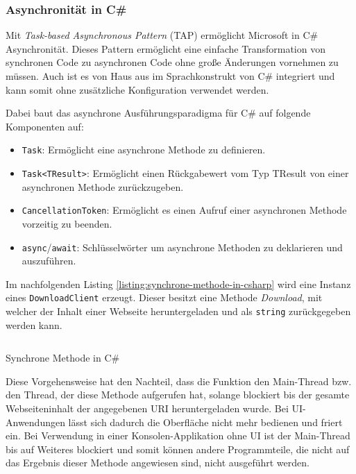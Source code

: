 \subsubsection{Asynchronität in C\#}
\label{subsubsec:ansynchronitaet-in-csharp}

Mit \textit{Task-based Asynchronous Pattern} (TAP) ermöglicht Microsoft in C\# Asynchronität. Dieses Pattern ermöglicht eine einfache Transformation von synchronen Code zu asynchronen Code ohne große Änderungen vornehmen zu müssen. Auch ist es von Haus aus im Sprachkonstrukt von C\# integriert und kann somit ohne zusätzliche Konfiguration verwendet werden.

Dabei baut das asynchrone Ausführungsparadigma für C\# auf folgende Komponenten auf:
\begin{itemize}
    \item \texttt{Task}: Ermöglicht eine asynchrone Methode zu definieren.
    \item \texttt{Task<TResult>}: Ermöglicht einen Rückgabewert vom Typ TResult von einer asynchronen Methode zurückzugeben.
    \item \texttt{CancellationToken}: Ermöglicht es einen Aufruf einer asynchronen Methode vorzeitig zu beenden.
    \item \texttt{async}/\texttt{await}: Schlüsselwörter um asynchrone Methoden zu deklarieren und auszuführen.
\end{itemize}

Im nachfolgenden Listing \ref{listing:synchrone-methode-in-csharp} wird eine Instanz eines \texttt{DownloadClient} erzeugt. Dieser besitzt eine Methode \textit{Download}, mit welcher der Inhalt einer Webseite heruntergeladen und als \texttt{string} zurückgegeben werden kann.

\begin{listing}[H]
    \inputminted[framesep=2mm, baselinestretch=1.2, fontsize=\normalsize, linenos]{csharp}{codes/example_synchronous.cs}
    \caption{Synchrone Methode in C\#}
    \label{listing:synchrone-methode-in-csharp}
\end{listing}

Diese Vorgehensweise hat den Nachteil, dass die Funktion den Main-Thread bzw. den Thread, der diese Methode aufgerufen hat, solange blockiert bis der gesamte Webseiteninhalt der angegebenen URI heruntergeladen wurde. Bei UI-Anwendungen lässt sich dadurch die Oberfläche nicht mehr bedienen und friert ein. Bei Verwendung in einer Konsolen-Applikation ohne UI ist der Main-Thread bis auf Weiteres blockiert und somit können andere Programmteile, die nicht auf das Ergebnis dieser Methode angewiesen sind, nicht ausgeführt werden.

